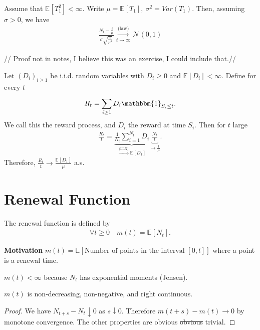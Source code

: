 \begin{theorem}
	Assume that $\mathbb{E}_{} \left[ T_1^2 \right] < \infty $. Write $\mu = \mathbb{E}_{} \left[ T_1 \right], \ \sigma^2 = Var(T_1)$. Then, assuming $\sigma>0$, we have
	\begin{align}
	\frac{N_t - \frac{t}{\mu }}{\sigma \sqrt{\frac{t}{\mu^3}}} \overset{\textrm{(law)}}{\underset{t \to \infty }{\longrightarrow}} \mathcal{N}(0,1)
	\end{align}
\end{theorem}
{\color{blue} // Proof not in notes, I believe this was an exercise, I could include that.//}

\begin{ex}
	Let $(D_i)_{i\geq 1}$ be i.i.d. random variables with $D_i\geq 0$ and $\mathbb{E}_{} \left[ D_i \right] < \infty $. Define for every $t$ 
	\begin{align}
		R_t = \sum_{i\geq 1}^{} D_i \mathbbm{1}_{S_i \leq t}. 
	\end{align}
We call this the reward process, and $D_i$ the reward at time $S_i$. Then for $t $ large
\begin{align}
	\frac{R_t}{t}= \underbrace{\frac{1}{N_t} \sum_{i=1}^{N_t} D_i}_{\stackrel{\textrm{(LLN)}}{\to} \mathbb{E}_{} \left[ D_1 \right]} \underbrace{\frac{N_t}{t}}_{\to\frac{1}{\mu }}.
\end{align}
Therefore, $\frac{R_t}{t} \to \frac{\mathbb{E}_{} \left[ D_1 \right] }{\mu }$ a.s.
\end{ex}


\section{Renewal Function}
\begin{defn}
	The renewal function is defined by 
	\begin{align}
		\boxed{		\forall t\geq 0\quad  m(t) = \mathbb{E}_{} \left[ N_t \right] .}
	\end{align}
\end{defn}
\noindent
\textbf{Motivation} $m(t) = \mathbb{E}_{} \left[ \textrm{Number of points in the interval }[0,t] \right] $ where a point is a renewal time.

\begin{rmk}[]
	$m(t)<\infty$ because $N _t$ has exponential moments (Jensen).
\end{rmk}

\begin{prop}[]
	$m(t)$ is non-decreasing, non-negative, and right continuous.
\end{prop}
\begin{proof}
	We have $N_{t+s} - N_t \downarrow 0$ as $s \downarrow 0$. Therefore $m(t+s)-m(t) \to 0$ by monotone convergence. The other properties are obvious {\color{blue}\st{obvious} trivial}.
\end{proof}

